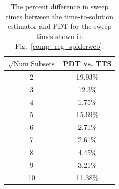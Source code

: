 \begin{table}[!ht]
\centering
\caption{The percent difference in sweep times between the time-to-solution estimator and PDT for the sweep times shown in Fig.~\ref{comp_reg_spiderweb}.}
\label{diff_reg_spiderweb}
\begin{tabular}{c|c}
\textbf{$\sqrt{\text{Num Subsets}}$} & \bf PDT vs. TTS \\ \hline
2&19.93\%\\ \hline
3&12.3\%\\ \hline
4&1.75\%\\ \hline
5&15.69\%\\ \hline
6&2.71\%\\ \hline
7&2.61\%\\ \hline
8&4.45\%\\ \hline
9&3.21\%\\ \hline
10&11.38\%
\end{tabular}
\end{table}


